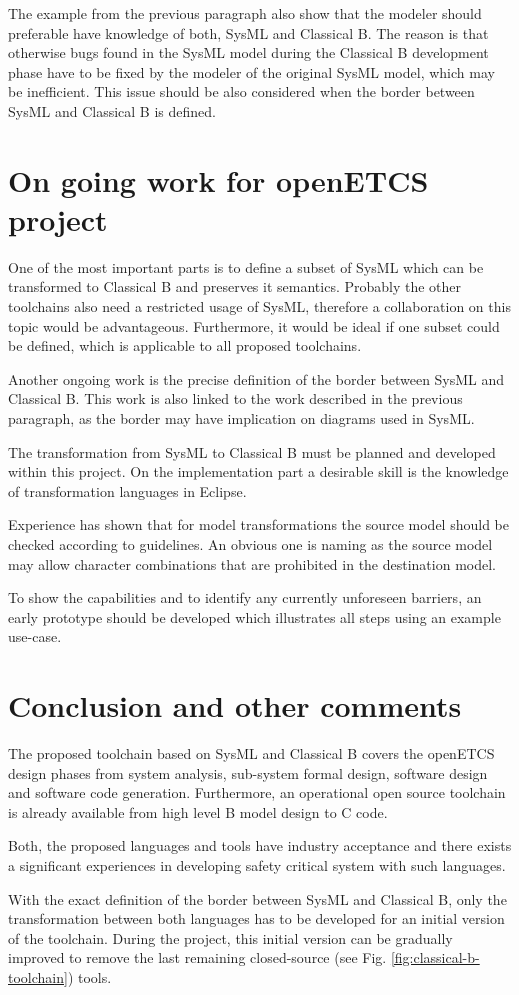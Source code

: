 The example from the previous paragraph also show that the modeler
should preferable have knowledge of both, SysML and Classical B. The
reason is that otherwise bugs found in the SysML model during the
Classical B development phase have to be fixed by the modeler of the
original SysML model, which may be inefficient. This issue should be
also considered when the border between SysML and Classical B is
defined.

\section{On going work for openETCS project}

One of the most important parts is to define a subset of SysML which
can be transformed to Classical B and preserves it semantics. Probably
the other toolchains also need a restricted usage of SysML, therefore
a collaboration on this topic would be advantageous. Furthermore, it
would be ideal if one subset could be defined, which is applicable to
all proposed toolchains.

Another ongoing work is the precise definition of the border between
SysML and Classical B. This work is also linked to the work described
in the previous paragraph, as the border may have implication on
diagrams used in SysML.

The transformation from SysML to Classical B must be planned and
developed within this project. On the implementation part a desirable
skill is the knowledge of transformation languages in Eclipse.

Experience has shown that for model transformations the source model
should be checked according to guidelines. An obvious one is naming as
the source model may allow character combinations that are prohibited
in the destination model.

To show the capabilities and to identify any currently unforeseen
barriers, an early prototype should be developed which illustrates all
steps using an example use-case.

\section{Conclusion and other comments}

The proposed toolchain based on SysML and Classical B covers the
openETCS design phases from system analysis, sub-system formal design,
software design and software code generation. Furthermore, an
operational open source toolchain is already available from high level
B model design to C code.

Both, the proposed languages and tools have industry acceptance and
there exists a significant experiences in developing safety critical
system with such languages.

With the exact definition of the border between SysML and Classical B,
only the transformation between both languages has to be developed for
an initial version of the toolchain. During the project, this initial
version can be gradually improved to remove the last remaining
closed-source (see Fig. \ref{fig:classical-b-toolchain}) tools.
